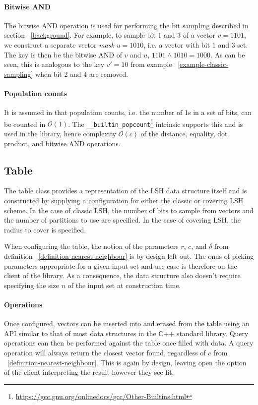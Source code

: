 \paragraph{Bitwise AND} The bitwise AND operation is used for performing the bit sampling described in section ~\ref{background}. For example, to sample bit 1 and 3 of a vector $v = 1101$, we construct a separate vector \textit{mask} $u = 1010$, i.e. a vector with bit 1 and 3 set. The key is then be the bitwise AND of $v$ and $u$, $1101 \wedge 1010 = 1000$. As can be seen, this is analogous to the key $v' = 10$ from example ~\ref{example-classic-sampling} when bit 2 and 4 are removed.

\paragraph{Population counts} It is assumed in \cite{DBLP:journals/corr/Pagh15} that population counts, i.e. the number of 1s in a set of bits, can be counted in $\mathcal{O}(1)$. The \texttt{\_\_builtin\_popcount}\footnote{\url{https://gcc.gnu.org/onlinedocs/gcc/Other-Builtins.html}} intrinsic supports this and is used in the library, hence complexity $\mathcal{O}(c)$ of the distance, equality, dot product, and bitwise AND operations.

\subsection{Table}

The table class provides a representation of the LSH data structure itself and is constructed by supplying a configuration for either the classic or covering LSH scheme. In the case of classic LSH, the number of bits to sample from vectors and the number of partitions to use are specified. In the case of covering LSH, the radius to cover is specified.

When configuring the table, the notion of the parameters $r$, $c$, and $\delta$ from definition ~\ref{definition-nearest-neighbour} is by design left out. The onus of picking parameters appropriate for a given input set and use case is therefore on the client of the library. As a consequence, the data structure also doesn't require specifying the size $n$ of the input set at construction time.

\paragraph{Operations} Once configured, vectors can be inserted into and erased from the table using an API similar to that of most data structures in the C++ standard library. Query operations can then be performed against the table once filled with data. A query operation will always return the closest vector found, regardless of $c$ from ~\ref{definition-nearest-neighbour}. This is again by design, leaving open the option of the client interpreting the result however they see fit.

